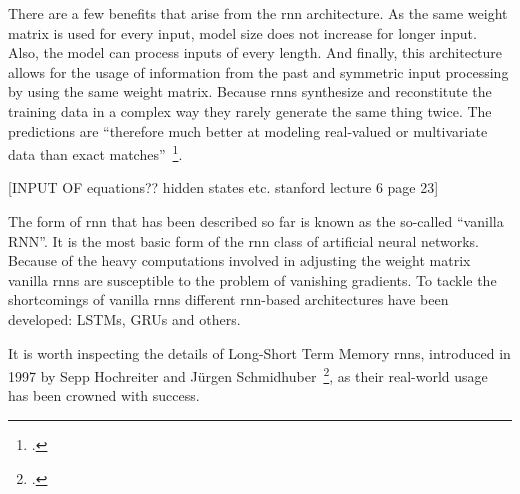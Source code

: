 There are a few benefits that arise from the \gls{rnn} architecture. As the same weight matrix is used for every input, model size does not increase for longer input. Also, the model can process inputs of every length. And finally, this architecture allows for the usage of information from the past and symmetric input processing by using the same weight matrix. Because \gls{rnn}s synthesize and reconstitute the training data in a complex way they rarely generate the same thing twice. The predictions are “therefore much better at modeling real-valued or multivariate data than exact matches”~\footcite{DBLP:journals/corr/Graves13}.

[INPUT OF equations?? hidden states etc. stanford lecture 6 page 23]

The form of \gls{rnn} that has been described so far is known as the so-called “vanilla RNN”. It is the most basic form of the \gls{rnn} class of artificial neural networks. Because of the heavy computations involved in adjusting the weight matrix vanilla \gls{rnn}s are susceptible to the problem of vanishing gradients. To tackle the shortcomings of vanilla \gls{rnn}s different \gls{rnn}-based architectures have been developed: LSTMs, GRUs and others.

It is worth inspecting the details of Long-Short Term Memory \gls{rnn}s, introduced in 1997 by Sepp Hochreiter and Jürgen Schmidhuber~\footcite{818041}, as their real-world usage has been crowned with success.

\bigskip


